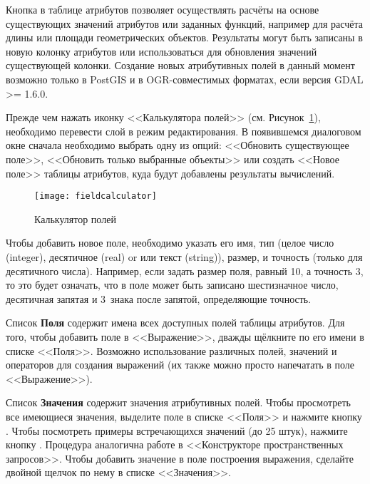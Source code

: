 Кнопка  в
таблице атрибутов позволяет осуществлять расчёты на основе существующих
значений атрибутов или заданных функций, например для расчёта длины или
площади геометрических объектов. Результаты могут быть записаны в новую
колонку атрибутов или использоваться для обновления значений существующей
колонки. Создание новых атрибутивных полей в данный момент возможно только
в PostGIS и в OGR-совместимых форматах, если версия GDAL >= 1.6.0.

Прежде чем нажать иконку <<Калькулятора полей>> (см. Рисунок~\ref{fig:field_calculator}),
необходимо перевести слой в режим редактирования. В появившемся диалоговом
окне сначала необходимо выбрать одну из опций: <<Обновить существующее поле>>,
<<Обновить только выбранные объекты>> или создать <<Новое поле>> таблицы
атрибутов, куда будут добавлены результаты вычислений.

\begin{figure}[ht]
  \centering
    \texttt{[image: fieldcalculator]}
    \caption{Калькулятор полей \wincaption}\label{fig:field_calculator}
\end{figure}

Чтобы добавить новое поле, необходимо указать его имя, тип (целое число
(integer), десятичное (real) or или текст (string)), размер, и точность
(только для десятичного числа). Например, если задать размер поля, равный
10, а точность 3, то это будет означать, что в поле может быть записано
шестизначное число, десятичная запятая и 3~знака после запятой, определяющие
точность.

Список \textbf{Поля} содержит имена всех доступных полей таблицы атрибутов.
Для того, чтобы добавить поле в <<Выражение>>, дважды щёлкните по его имени
в списке <<Поля>>. Возможно использование различных полей, значений и
операторов для создания выражений (их также можно просто напечатать в
поле <<Выражение>>).

Список \textbf{Значения} содержит значения атрибутивных полей. Чтобы
просмотреть все имеющиеся значения, выделите поле в списке <<Поля>> и
нажмите кнопку  .
Чтобы посмотреть примеры встречающихся значений (до 25 штук), нажмите
кнопку  .
Процедура аналогична работе в <<Конструкторе пространственных запросов>>.
Чтобы добавить значение в поле построения выражения, сделайте двойной
щелчок по нему в списке <<Значения>>.

